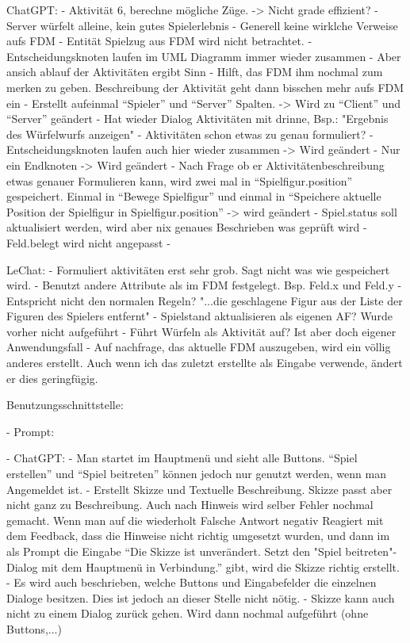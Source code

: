         ChatGPT:
            - Aktivität 6, berechne mögliche Züge. -> Nicht grade effizient?
            - Server würfelt alleine, kein gutes Spielerlebnis
            - Generell keine wirklche Verweise aufs FDM
            - Entität Spielzug aus FDM wird nicht betrachtet.
            - Entscheidungsknoten laufen im UML Diagramm immer wieder zusammen
            - Aber ansich ablauf der Aktivitäten ergibt Sinn 
            - Hilft, das FDM ihm nochmal zum merken zu geben. Beschreibung der Aktivität geht dann bisschen mehr aufs FDM ein
            - Erstellt aufeinmal ``Spieler'' und ``Server'' Spalten. -> Wird zu ``Client'' und ``Server'' geändert
            - Hat wieder Dialog Aktivitäten mit drinne, Bsp.: "Ergebnis des Würfelwurfs anzeigen"
            - Aktivitäten schon etwas zu genau formuliert?
            - Entscheidungsknoten laufen auch hier wieder zusammen -> Wird geändert
            - Nur ein Endknoten -> Wird geändert
            - Nach Frage ob er Aktivitätenbeschreibung etwas genauer Formulieren kann, wird zwei mal in ``Spielfigur.position''
            gespeichert. Einmal in ``Bewege Spielfigur'' und einmal in ``Speichere aktuelle Position der Spielfigur in Spielfigur.position''
                -> wird geändert
            - Spiel.status soll aktualisiert werden, wird aber nix genaues Beschrieben was geprüft wird
            - Feld.belegt wird nicht angepasst
            -


        LeChat:
            - Formuliert aktivitäten erst sehr grob. Sagt nicht was wie gespeichert wird.
            - Benutzt andere Attribute als im FDM festgelegt. Bsp. Feld.x und Feld.y
            - Entspricht nicht den normalen Regeln? "...die geschlagene Figur aus der Liste der Figuren des Spielers entfernt"
            - Spielstand aktualisieren als eigenen AF? Wurde vorher nicht aufgeführt
            - Führt Würfeln als Aktivität auf? Ist aber doch eigener Anwendungsfall
            - Auf nachfrage, das aktuelle FDM auszugeben, wird ein völlig anderes erstellt. Auch wenn ich 
            das zuletzt erstellte als Eingabe verwende, ändert er dies geringfügig.



Benutzungsschnittstelle:

- Prompt:

- ChatGPT:
    - Man startet im Hauptmenü und sieht alle Buttons. ``Spiel erstellen'' und ``Spiel beitreten'' können jedoch nur 
    genutzt werden, wenn man Angemeldet ist.
    - Erstellt Skizze und Textuelle Beschreibung. Skizze passt aber nicht ganz zu Beschreibung. Auch nach Hinweis wird 
    selber Fehler nochmal gemacht. Wenn man auf die wiederholt Falsche Antwort negativ Reagiert mit dem Feedback, dass 
    die Hinweise nicht richtig umgesetzt wurden, und dann im als Prompt die Eingabe ``Die Skizze ist unverändert. 
    Setzt den "Spiel beitreten"-Dialog mit dem Hauptmenü in Verbindung.'' gibt, wird die Skizze richtig erstellt.
    - Es wird auch beschrieben, welche Buttons und Eingabefelder die einzelnen Dialoge besitzen. Dies ist jedoch 
    an dieser Stelle nicht nötig.
    - Skizze kann auch nicht zu einem Dialog zurück gehen. Wird dann nochmal aufgeführt (ohne Buttons,...)


